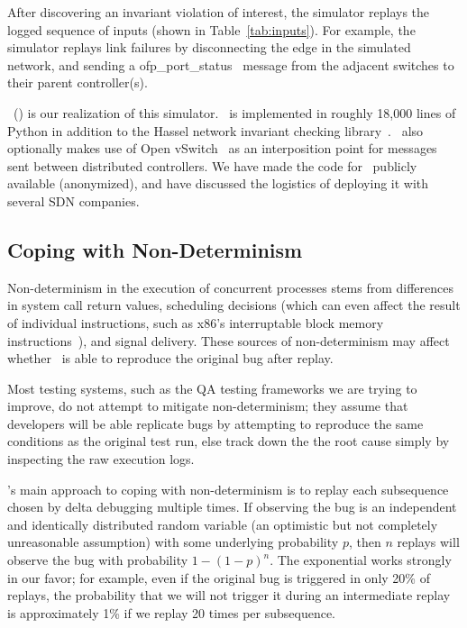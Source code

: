 After discovering an invariant violation of interest, the simulator replays
the logged sequence of inputs (shown in Table~\ref{tab:inputs}). For example, the simulator replays link failures
by disconnecting the edge in the simulated network, and sending a
ofp\_port\_status~\cite{openflow} message from the adjacent switches to their parent controller(s).

\projectname~(\projectmeaning) is our realization of this simulator.
\projectname~is implemented in roughly 18,000 lines of Python in
addition to the Hassel network invariant checking library~\cite{hsa}.
\projectname~also optionally makes use of Open vSwitch~\cite{pfaff2009extending} as an interposition point for
messages sent between distributed controllers. We have
made the code
for \projectname~publicly available (anonymized), %
and have discussed the logistics of deploying it with several SDN companies.



\subsection{Coping with Non-Determinism}

Non-determinism in the execution of concurrent processes stems from
differences in system call return values, scheduling decisions (which can
even affect the result of individual instructions, such as x86's
interruptable block memory instructions~\cite{Dunlap:2002:REI:844128.844148}), and signal
delivery. These sources of non-determinism may affect whether \projectname~is
able to reproduce the original bug after replay.

Most testing systems, such as the QA testing frameworks we are
trying to improve, do not attempt to mitigate non-determinism; they assume
that developers will be able replicate bugs by attempting to reproduce the
same conditions as the original test run, else track down the the root cause simply by
inspecting the raw execution logs.

\projectname's main approach to coping with non-determinism
is to replay each subsequence chosen
by delta debugging multiple times. If observing the bug
is an independent and identically distributed random variable (an optimistic
but not completely unreasonable assumption) with some
underlying probability $p$, then $n$
replays will observe the bug with probability $1-(1-p)^{n}$. The exponential
works strongly in our favor; for example, even if the original bug is
triggered in only 20\% of replays, the probability that we will not trigger
it during an intermediate replay is approximately
1\% if we replay 20 times per subsequence.

